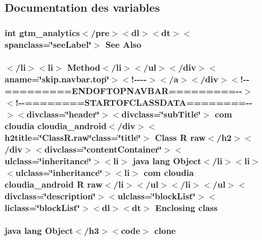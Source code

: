 \subsection{Documentation des variables}
\hypertarget{_r_8raw_8html_adf088dda8f5434b5115e29d6f8c6681b}{
\subsubsection[{Also}]{\setlength{\rightskip}{0pt plus 5cm}int gtm\-\_\-analytics$<$/pre$>$$<$dl$>$$<${\bf dt}$>$$<$spanclass=\char`\"{}see\-Label\char`\"{}$>$ See Also}}\label{_r_8raw_8html_adf088dda8f5434b5115e29d6f8c6681b}
\hypertarget{_r_8raw_8html_aa50e3e8e00691e4baeeaab03b7b6cc2d}{
\subsubsection[{class}]{\setlength{\rightskip}{0pt plus 5cm}$<$/li$>$$<$li$>$ Method$<$/li$>$$<$/ul$>$$<$/div$>$$<$aname=\char`\"{}skip.\-navbar.\-top\char`\"{}$>$$<$!-\/-\/-\/-\/$>$$<$/a$>$$<$/div$>$$<$!-\/-\/=========E\-N\-D\-O\-F\-T\-O\-P\-N\-A\-V\-B\-A\-R=========-\/-\/$>$$<$!-\/-\/========S\-T\-A\-R\-T\-O\-F\-C\-L\-A\-S\-S\-D\-A\-T\-A========-\/-\/$>$$<$divclass=\char`\"{}header\char`\"{}$>$$<$divclass=\char`\"{}sub\-Title\char`\"{}$>$ com cloudia cloudia\-\_\-android$<$/div$>$$<$h2title=\char`\"{}Class\-R.\-raw\char`\"{}class=\char`\"{}title\char`\"{}$>$ Class {\bf R} {\bf raw}$<$/h2$>$$<$/div$>$$<$divclass=\char`\"{}content\-Container\char`\"{}$>$$<$ulclass=\char`\"{}inheritance\char`\"{}$>$$<$li$>$ java lang Object$<$/li$>$$<$li$>$$<$ulclass=\char`\"{}inheritance\char`\"{}$>$$<$li$>$ com cloudia cloudia\-\_\-android {\bf R} {\bf raw}$<$/li$>$$<$/ul$>$$<$/li$>$$<$/ul$>$$<$divclass=\char`\"{}description\char`\"{}$>$$<$ulclass=\char`\"{}block\-List\char`\"{}$>$$<$liclass=\char`\"{}block\-List\char`\"{}$>$$<$dl$>$$<${\bf dt}$>$ Enclosing class}}\label{_r_8raw_8html_aa50e3e8e00691e4baeeaab03b7b6cc2d}
\hypertarget{_r_8raw_8html_adc9607fcabf6f2d7f401ad52015ef6e0}{
\subsubsection[{clone}]{\setlength{\rightskip}{0pt plus 5cm}java lang Object$<$/h3$>$$<$code$>$ clone}}\label{_r_8raw_8html_adc9607fcabf6f2d7f401ad52015ef6e0}
